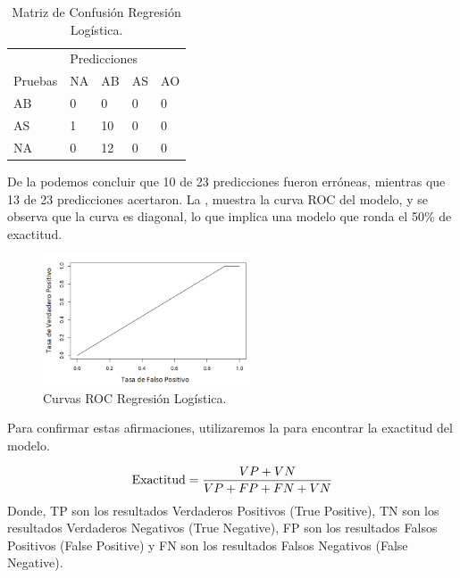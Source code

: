 \documentclass{textolivre}
\begin{document}
\begin{table}[htpb]
\centering
\caption{Matriz de Confusión Regresión Logística.}
\label{tab3}
\begin{tabular}{lllll}
\toprule 
 & \multicolumn{4}{l}{Predicciones}   \\ 
\cmidrule{2-5}
Pruebas        & NA      & AB       & AS       & AO
\\ 
\midrule
AB             & 0       & 0        & 0        & 0
\\ 
AS             & 1       & 10       & 0        & 0
\\
NA             & 0       & 12       & 0        & 0
\\
\bottomrule
\end{tabular}
\end{table}

De la  podemos concluir que 10 de 23 predicciones fueron erróneas, mientras que 13 de 23 predicciones acertaron. La , muestra la curva ROC del modelo, y se observa que la curva es diagonal, lo que implica una modelo que ronda el 50\% de exactitud.

\begin{figure}[htbp]
 \centering
 \includegraphics[width=0.55\textwidth]{figura8.png}
 \caption{Curvas ROC Regresión Logística.}
 \label{figura8}
\end{figure}

Para confirmar estas afirmaciones, utilizaremos la   
para encontrar la exactitud del modelo.


\begin{equation}\label{eq01}
    \textmd{Exactitud} = \frac{ VP + VN }{VP + FP + FN + VN}
\end{equation}
Donde, 
TP son los resultados Verdaderos Positivos (True Positive),
TN son los resultados Verdaderos Negativos (True Negative),
FP son los resultados Falsos Positivos (False Positive) y 
FN son los resultados Falsos Negativos (False Negative).
\end{document}
